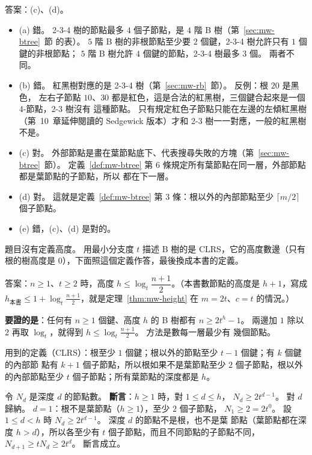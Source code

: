 答案：(c)、(d)。
\begin{itemize}
\item (a) 錯。 2-3-4 樹的節點最多 $4$ 個子節點，是 $4$ 階 B 樹（第~\ref{sec:mw-btree}~節
的表）。 $5$ 階 B 樹的非根節點至少要 $2$ 個鍵，2-3-4 樹允許只有 $1$ 個鍵的非根節點；
$5$ 階 B 樹允許 $4$ 個鍵的節點，2-3-4 樹最多 $3$ 個。 兩者不同。
\item (b) 錯。 紅黑樹對應的是 2-3-4 樹（第~\ref{sec:mw-rb}~節）。 反例：根 $20$ 是黑色，
左右子節點 $10$、$30$ 都是紅色，這是合法的紅黑樹，三個鍵合起來是一個 4-節點，2-3 樹沒有
這種節點。 只有規定紅色子節點只能在左邊的左傾紅黑樹（第~10~章延伸閱讀的 Sedgewick
版本）才和 2-3 樹一一對應，一般的紅黑樹不是。
\item (c) 對。 外部節點是畫在葉節點底下、代表搜尋失敗的方塊（第~\ref{sec:mw-btree}~節）。
定義~\ref{def:mw-btree} 第 6 條規定所有葉節點在同一層，外部節點都是葉節點的子節點，所以
都在下一層。
\item (d) 對。 這就是定義~\ref{def:mw-btree} 第 3 條：根以外的內部節點至少
$\lceil m/2 \rceil$ 個子節點。
\item (e) 錯，(c)、(d) 是對的。
\end{itemize}

題目沒有定義高度。 用最小分支度 $t$ 描述 B 樹的是 CLRS，它的高度數邊（只有根的樹高度是
$0$），下面照這個定義作答，最後換成本書的定義。

答案：$n \ge 1$、$t \ge 2$ 時，高度 $h \le \log_t \dfrac{n + 1}{2}$。（本書數節點的高度是
$h + 1$，寫成 $h_{\text{本書}} \le 1 + \log_t \frac{n+1}{2}$，就是定理~\ref{thm:mw-height}
在 $m = 2t$、$c = t$ 的情況。）

\textbf{要證的是}：任何有 $n \ge 1$ 個鍵、高度 $h$ 的 B 樹都有 $n \ge 2t^h - 1$。 兩邊加
$1$ 除以 $2$ 再取 $\log_t$，就得到 $h \le \log_t \frac{n+1}{2}$。 方法是數每一層最少有
幾個節點。

用到的定義（CLRS）：根至少 $1$ 個鍵；根以外的節點至少 $t - 1$ 個鍵；有 $k$ 個鍵的內部節
點有 $k + 1$ 個子節點，所以根如果不是葉節點至少 $2$ 個子節點，根以外的內部節點至少 $t$
個子節點；所有葉節點的深度都是 $h$。

令 $N_d$ 是深度 $d$ 的節點數。 \textbf{斷言}：$h \ge 1$ 時，對 $1 \le d \le h$，
$N_d \ge 2t^{d-1}$。 對 $d$ 歸納。 $d = 1$：根不是葉節點（$h \ge 1$），至少 $2$ 個子節點，
$N_1 \ge 2 = 2t^0$。 設 $1 \le d < h$ 時 $N_d \ge 2t^{d-1}$。 深度 $d$ 的節點不是根，也不是葉
節點（葉節點都在深度 $h > d$），所以各至少有 $t$ 個子節點，而且不同節點的子節點不同，
$N_{d+1} \ge t N_d \ge 2t^d$。 斷言成立。

